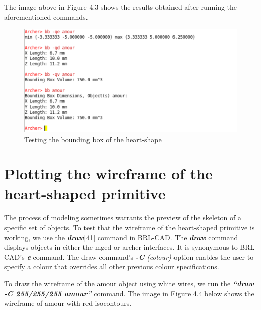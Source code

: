\hspace{30} The image above in Figure 4.3 shows the results obtained after running the aforementioned commands. 

\begin{figure}[htbp]
\centering
\includegraphics[trim=0.0cm 0.5cm 0.1cm 0.1cm, clip=true, totalheight=0.4\textheight]{Pictures/Bounding.png}
\caption[Testing the bounding box of the heart­-shape]{Testing the bounding box of the heart­-shape}
\label{Bounding}
\end{figure}

\section{Plotting the wireframe of the heart­-shaped primitive}

\hspace{30} The   process   of   modeling   sometimes   warrants   the   preview   of   the   skeleton  
of   a   specific   set   of   objects.   To   test   that   the   wireframe   of   the   heart­-shaped  
primitive   is   working,   we   use   the   \textit{\textbf{draw}}[41]   command   in   BRL­-CAD.   The   \textit{\textbf{draw}}  
command   displays   objects   in   either   the   mged   or   archer   interfaces.   It   is  
synonymous   to   BRL­-CAD's   \textit{\textbf{e}}   command.   The   draw   command's   \textit{\textbf{-­C} (colour)}  
option   enables   the   user   to   specify   a   colour   that   overrides   all   other   previous  
colour specifications.  

\hspace{30} To   draw   the   wireframe   of   the   amour   object   using   white   wires,   we   run   the  
\textit{\textbf{“draw -­C 255/255/255 amour”}}   command.   The   image   in   Figure   4.4   below   shows  
the wireframe of amour with red iso­contours.  

